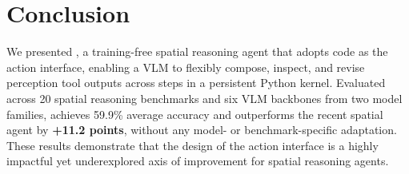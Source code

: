 \section{Conclusion}
We presented \ours{}, a training-free spatial reasoning agent that adopts code as the action interface, enabling a VLM to flexibly compose, inspect, and revise perception tool outputs across steps in a persistent Python kernel.
Evaluated across 20 spatial reasoning benchmarks and six VLM backbones from two model families, \ours{} achieves 59.9\% average accuracy and outperforms the recent spatial agent by \textbf{+11.2 points}, without any model- or benchmark-specific adaptation.
These results demonstrate that the design of the action interface is a highly impactful yet underexplored axis of improvement for spatial reasoning agents.
